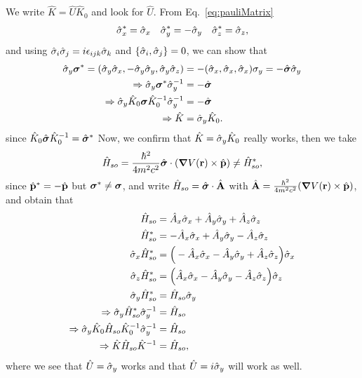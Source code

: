 \documentclass[floatfix,prb,aps,superscriptaddress,11pt]{revtex4}
\begin{document}
We write $\hat K=\hat U \hat K_0$ and look for $\hat U$.
From Eq.~\eqref{eq:pauliMatrix}
\begin{align}\label{e.34}
\hat
{\sigma}^*_x=\hat{\sigma}_x 
\quad 
\hat{\sigma}^*_y=-\hat{\sigma}_y 
\quad 
\hat{\sigma}^*_z=\hat{\sigma}_z
,
\end{align}
and using $\hat{\sigma}_i\hat{\sigma}_j=i\epsilon_{ijk}\hat{\sigma}_k$ and
$\{\hat{\sigma}_i,\hat{\sigma}_j\}=0$, we can show that
\begin{align}\label{e.34n}
\hat{\sigma}_y\boldsymbol{\sigma}^*=
(\hat{\sigma}_y\hat{\sigma}_x,-\hat{\sigma}_y\hat{\sigma}_y,\hat{\sigma}_y\hat{\sigma}_z)
&=-(\hat{\sigma}_x,\hat{\sigma}_x,\hat{\sigma}_x)\sigma_y
=-\hat{\boldsymbol{\sigma}}\hat{\sigma}_y
\nonumber\\
\Rightarrow 
\hat{\sigma}_y\boldsymbol{\sigma}^*\hat{\sigma}^{-1}_y&=-\hat{\boldsymbol{\sigma}} 
\nonumber\\
\Rightarrow 
\hat{\sigma}_y\hat K_0\boldsymbol{\sigma}\hat K_0^{-1}\hat{\sigma}^{-1}_y&=-\hat{\boldsymbol{\sigma}} 
\nonumber\\
\Rightarrow 
\hat K&=\hat{\sigma}_y\hat K_0
.
\end{align}
since $\hat K_0\hat{\boldsymbol{\sigma}}\hat K^{-1}_0=\hat{\boldsymbol{\sigma}}^*$ 
Now, we confirm that $\hat K=\hat{\sigma}_y\hat K_0$ really works, then we take
\begin{align}\label{e.35}
\hat H_{so}=
\frac{\hbar^2}{4m^2c^2}
\hat{\boldsymbol{\sigma}}\cdot (\boldsymbol{\nabla} V(\mathbf{r})\times\hat {\mathbf{p}}) 
\neq \hat H^*_{so}
,
\end{align}
since $\hat {\mathbf{p}}^*=-\hat{\mathbf{p}}$ but $\boldsymbol{\sigma}^*\neq\boldsymbol{\sigma}$,
and write 
$\hat H_{so}=
\hat{\boldsymbol{\sigma}}\cdot \hat{\mathbf{A}} $
with 
$\hat{\mathbf{A}}=\frac{\hbar^2}{4m^2c^2}(\boldsymbol{\nabla} V(\mathbf{r})\times\hat {\mathbf{p}})$, 
and obtain that
\begin{align}\label{e.36}
\hat H_{so}&=\hat A_x \hat {\sigma}_x +\hat A_y \hat {\sigma}_y +\hat A_z \hat {\sigma}_z 
\nonumber\\
\hat H^*_{so}&=-\hat A_x \hat {\sigma}_x +\hat A_y \hat {\sigma}_y -\hat A_z \hat {\sigma}_z 
\nonumber\\
\hat{\sigma}_x\hat H^*_{so}&=\Big(-\hat A_x \hat {\sigma}_x -\hat A_y \hat {\sigma}_y +\hat A_z \hat {\sigma}_z\Big)\hat{\sigma}_x 
\nonumber\\
\hat{\sigma}_z\hat H^*_{so}&=\Big(\hat A_x \hat {\sigma}_x -\hat A_y \hat {\sigma}_y -\hat A_z \hat {\sigma}_z\Big)\hat{\sigma}_z 
\nonumber\\
\hat{\sigma}_y\hat H^*_{so}&=\hat H_{so}\hat{\sigma}_y 
\nonumber\\
\Rightarrow \hat{\sigma}_y\hat H^*_{so}\hat{\sigma}^{-1}_y&=\hat H_{so}
\nonumber\\
\Rightarrow \hat{\sigma}_y\hat K_0\hat H_{so}\hat K^{-1}_0\hat{\sigma}^{-1}_y&=\hat H_{so}
\nonumber\\
\Rightarrow \hat K\hat H_{so}\hat K^{-1}&=\hat H_{so}
,
\end{align} 
where we see that  $\hat U=\hat{\sigma}_y$ works and that $\hat
U=i\hat{\sigma}_y$ will work as well.
\end{document}
